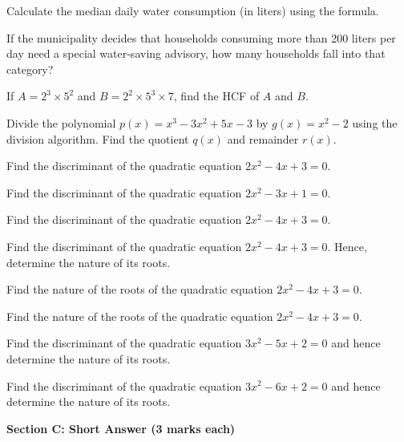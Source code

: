 \documentclass[12pt,a4paper]{exam}
\begin{document}
\begin{questions}
\question[4] Calculate the median daily water consumption (in liters) using the formula.
\vspace{0.15cm}

\question[4] If the municipality decides that households consuming more than 200 liters per day need a special water‑saving advisory, how many households fall into that category?
\vspace{0.15cm}

\question[1] If $A = 2^3 \times 5^2$ and $B = 2^2 \times 5^3 \times 7$, find the HCF of $A$ and $B$.
\vspace{0.15cm}

\question[2] Divide the polynomial $p(x) = x^3 - 3x^2 + 5x - 3$ by $g(x) = x^2 - 2$ using the division algorithm. Find the quotient $q(x)$ and remainder $r(x)$.
\vspace{0.15cm}

\question[1] Find the discriminant of the quadratic equation $2x^2 - 4x + 3 = 0$.
\vspace{0.15cm}

\question[1] Find the discriminant of the quadratic equation $2x^2 - 3x + 1 = 0$.
\vspace{0.15cm}

\question[1] Find the discriminant of the quadratic equation $2x^2 - 4x + 3 = 0$.
\vspace{0.15cm}

\question[2] Find the discriminant of the quadratic equation $2x^2 - 4x + 3 = 0$. Hence, determine the nature of its roots.
\vspace{0.15cm}

\question[2] Find the nature of the roots of the quadratic equation $2x^2 - 4x + 3 = 0$.
\vspace{0.15cm}

\question[2] Find the nature of the roots of the quadratic equation $2x^2 - 4x + 3 = 0$.
\vspace{0.15cm}

\question[2] Find the discriminant of the quadratic equation $3x^2 - 5x + 2 = 0$ and hence determine the nature of its roots.
\vspace{0.15cm}

\question[2] Find the discriminant of the quadratic equation $3x^2 - 6x + 2 = 0$ and hence determine the nature of its roots.
\vspace{0.15cm}

\end{questions}
\bigskip
\noindent\textbf{\large Section C: Short Answer (3 marks each)}
\end{document}

